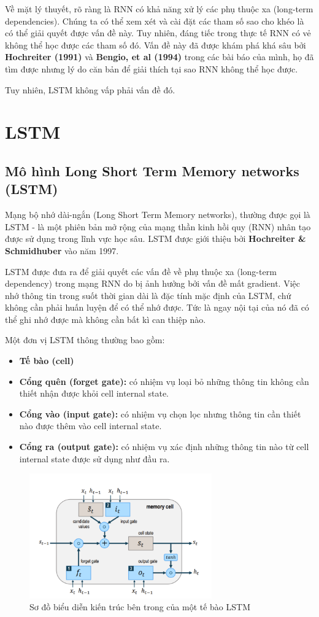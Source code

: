Về mặt lý thuyết, rõ ràng là RNN có khả năng xử lý các phụ thuộc xa (long-term dependencies). Chúng ta có thể xem xét và cài đặt các tham số sao cho khéo là có thể giải quyết được vấn đề này. Tuy nhiên, đáng tiếc trong thực tế RNN có vẻ không thể học được các tham số đó. Vấn đề này đã được khám phá khá sâu bởi \textbf{Hochreiter (1991)} và \textbf{Bengio, et al (1994)} trong các bài báo của mình, họ đã tìm được nhưng lý do căn bản để giải thích tại sao RNN không thể học được. \par
Tuy nhiên, LSTM không vấp phải vấn đề đó.
\section{LSTM}
\subsection{Mô hình Long Short Term Memory networks (LSTM)}
Mạng bộ nhớ dài-ngắn (Long Short Term Memory networks), thường được gọi là LSTM - là một phiên bản mở rộng của mạng thần kinh hồi quy (RNN) nhân tạo được sử dụng trong lĩnh vực học sâu. LSTM được giới thiệu bởi \textbf{Hochreiter \& Schmidhuber}  vào năm 1997.\par
LSTM được đưa ra để giải quyết các vấn đề về phụ thuộc xa (long-term dependency) trong mạng RNN do bị ảnh hưởng bởi vấn đề mất gradient. Việc nhớ thông tin trong suốt thời gian dài là đặc tính mặc định của LSTM, chứ không cần phải huấn luyện để có thể nhớ được. Tức là ngay nội tại của nó đã có thể ghi nhớ được mà không cần bất kì can thiệp nào.\par

Một đơn vị LSTM thông thường bao gồm:
\begin{itemize}
    \item \textbf{Tế bào (cell)}
    \item \textbf{Cổng quên (forget gate):} có nhiệm vụ loại bỏ những thông tin không cần thiết nhận được khỏi cell internal state.
    \item \textbf{Cổng vào (input gate):} có nhiệm vụ chọn lọc nhưng thông tin cần thiết nào được thêm vào cell internal state.
    \item \textbf{Cổng ra (output gate):} có nhiệm vụ xác định những thông tin nào từ cell internal state được sử dụng như đầu ra.
\end{itemize}
\begin{figure}[H]
    \centering
\includegraphics[width=0.7\textwidth]{figures/sodo.png}
    \caption{Sơ đồ biểu diễn kiến trúc bên trong của một tế bào LSTM}
\end{figure}

